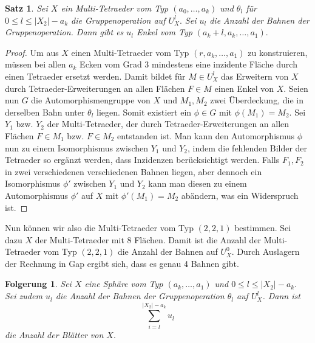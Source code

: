 \documentclass[12pt,titlepage,twoside,cleardoublepage]{article}
\theoremstyle{nummermitklammern}
\newtheorem{folgerung}[temp]{Folgerung}
\newtheorem{satz}[temp]{Satz}
\newtheorem{folgerung}[zahl]{Folgerung}
\newtheorem{satz}[zahl]{Satz}
\numberwithin{equation}{section}
\begin{document}
\begin{satz}
Sei $X$ ein Multi-Tetraeder vom Typ $(a_0,\ldots,a_k)$ und $\theta_l$ für $0\leq l\leq \vert X_2\vert -a_k$ die Gruppenoperation auf $U_X^l.$ Sei $u_l$ die Anzahl der Bahnen der Gruppenoperation. Dann gibt es $u_l$ Enkel vom Typ $(a_k+l,a_k,\ldots,a_1).$
\end{satz}
\begin{proof}
Um aus $X$ einen Multi-Tetraeder vom Typ $(r,a_k,\ldots,a_1)$ zu konstruieren, müssen bei allen $a_k$ Ecken vom Grad 3 mindestens eine inzidente Fläche durch einen Tetraeder ersetzt werden. Damit bildet für $M\in U_X^l$ das Erweitern von $X$ durch Tetraeder-Erweiterungen an allen Flächen $F\in M$ einen Enkel von $X$. Seien nun $G$ die Automorphismengruppe von $X$ und $M_1,M_2$ zwei Überdeckung, die in derselben Bahn unter $\theta_l$ liegen. Somit existiert ein $\phi \in G$ mit $\phi(M_1)=M_2.$ Sei $Y_1$ bzw. $Y_2$ der Multi-Tetraeder, der durch Tetraeder-Erweiterungen an allen Flächen $F\in M_1$ bzw. $F \in M_2$ entstanden ist. Man kann den Automorphismus $\phi$ nun zu einem Isomorphismus zwischen $Y_1$ und $Y_2$, indem die fehlenden Bilder der Tetraeder so ergänzt werden, dass Inzidenzen berücksichtigt werden. Falls $F_1,F_2$ in zwei verschiedenen verschiedenen Bahnen liegen, aber dennoch ein Isomorphismus $\phi'$ zwischen $Y_1$ und $Y_2$ kann man diesen zu einem Automorphismus $\phi'$ auf $X$ mit $\phi'(M_1)=M_2$ abändern, was ein Widerspruch ist.
\end{proof}
Nun können wir also die Multi-Tetraeder vom Typ $(2,2,1)$ bestimmen. Sei dazu $X$ der Multi-Tetraeder mit 8 Flächen.
Damit ist die Anzahl der Multi-Tetraeder vom Typ $(2,2,1)$ die Anzahl der Bahnen auf $U^0_X.$ Durch Auslagern der Rechnung in Gap ergibt sich, dass es genau 4 Bahnen gibt.
\begin{folgerung}
Sei $X$ eine Sphäre vom Typ $(a_k,\ldots, a_1)$ und $0\leq l\leq \vert X_2\vert -a_k.$ Sei zudem $u_l$ die Anzahl der Bahnen der Gruppenoperation $\theta_l$ auf $U_X^l$. Dann ist 
\[
\sum_{i=l}^{\vert X_2\vert -a_k} u_l
\] die Anzahl der Blätter von $X.$
\end{folgerung}
\end{document}
